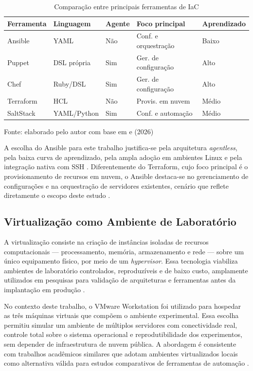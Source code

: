 \documentclass[12pt]{article}
\newcommand{\fonte}[1]{%
  \begin{flushleft}
    \footnotesize Fonte: #1
  \end{flushleft}%
}
\begin{document}
\begin{table}[H]
  \centering
  \small
  \caption{Comparação entre principais ferramentas de IaC}
  \label{tab:ferramentas}
  \begin{tabular}{p{3.0cm} p{3.0cm} p{1.5cm} p{3.8cm} p{1.8cm}}
    \toprule
    \textbf{Ferramenta} & \textbf{Linguagem} & \textbf{Agente} &
    \textbf{Foco principal} & \textbf{Aprendizado} \\
    \midrule
    Ansible   & YAML        & Não & Conf. e orquestração & Baixo  \\
    Puppet    & DSL própria & Sim & Ger. de configuração & Alto   \\
    Chef      & Ruby/DSL    & Sim & Ger. de configuração & Alto   \\
    Terraform & HCL         & Não & Provis. em nuvem     & Médio  \\
    SaltStack & YAML/Python & Sim & Conf. e automação    & Médio  \\
    \bottomrule
  \end{tabular}
  \fonte{elaborado pelo autor com base em \cite{ufcg_comparativo} e \cite{morris2016} (2026)}
\end{table}

A escolha do Ansible para este trabalho justifica-se pela arquitetura
\textit{agentless}, pela baixa curva de aprendizado, pela ampla adoção
em ambientes Linux e pela integração nativa com SSH \cite{alcidesmaya}.
Diferentemente do Terraform, cujo foco principal é o provisionamento de
recursos em nuvem, o Ansible destaca-se no gerenciamento de configurações
e na orquestração de servidores existentes, cenário que reflete
diretamente o escopo deste estudo \cite{ufcg_comparativo}.

\subsection{Virtualização como Ambiente de Laboratório}

A virtualização consiste na criação de instâncias isoladas de recursos
computacionais --- processamento, memória, armazenamento e rede --- sobre
um único equipamento físico, por meio de um \textit{hypervisor}. Essa
tecnologia viabiliza ambientes de laboratório controlados, reproduzíveis
e de baixo custo, amplamente utilizados em pesquisas para validação de
arquiteturas e ferramentas antes da implantação em produção
\cite{sapienza_2023}.

No contexto deste trabalho, o VMware Workstation foi utilizado para
hospedar as três máquinas virtuais que compõem o ambiente experimental.
Essa escolha permitiu simular um ambiente de múltiplos servidores com
conectividade real, controle total sobre o sistema operacional e
reprodutibilidade dos experimentos, sem depender de infraestrutura de
nuvem pública. A abordagem é consistente com trabalhos acadêmicos
similares que adotam ambientes virtualizados locais como alternativa
válida para estudos comparativos de ferramentas de automação
\cite{ufu2019}.
\end{document}
